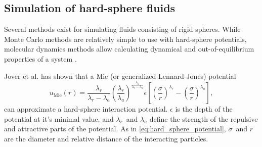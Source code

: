 
\subsection{Simulation of hard-sphere fluids}
Several methods exist for simulating fluids consisting of rigid spheres.
While Monte Carlo methods are relatively simple to use with hard-sphere potentials, 
molecular dynamics methods allow calculating dynamical and out-of-equilibrium properties of a system \cite{ref:allen:MD_sim}.


Jover et al. \cite{ref:jover:pseudo_hard} has shown that a Mie (or generalized Lennard-Jones) potential
\begin{equation}
    u_{\text{Mie}}(r) = 
        \frac{\lambda_r}{\lambda_r - \lambda_a}
        \left(\frac{\lambda_r}{\lambda_a}\right)
        ^{\frac{\lambda_a}{\lambda_r - \lambda_a}}
        \epsilon \left[
            \left(\frac{\sigma}{r}\right)^{\lambda_r} -
            \left(\frac{\sigma}{r}\right)^{\lambda_a}
        \right],
\end{equation}
can approximate a hard-sphere interaction potential.
$\epsilon$ is the depth of the potential 
%
at it's minimal value, %
%
and $\lambda_r$ and $\lambda_a$ define the strength of the 
repulsive and attractive parts of the potential.
As in \ref{eq:hard_sphere_potential}, 
$\sigma$ and $r$ are the diameter and relative distance of the interacting particles.


